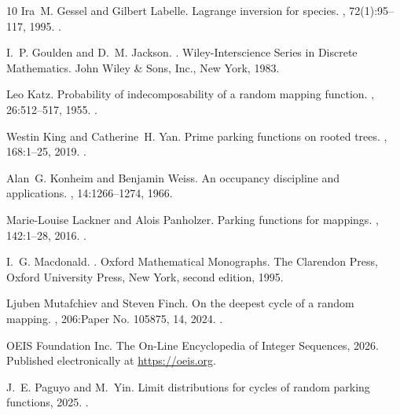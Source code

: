 \documentclass[letterpaper]{amsart}
\theoremstyle{plain}
\theoremstyle{definition}
\theoremstyle{remark}
\begin{document}
\begin{thebibliography}{10}
Ira~M. Gessel and Gilbert Labelle.
\newblock Lagrange inversion for species.
, 72(1):95--117, 1995.
\newblock \href {https://doi.org/10.1016/0097-3165(95)90030-6} {}.

I.~P. Goulden and D.~M. Jackson.
.
\newblock Wiley-Interscience Series in Discrete Mathematics. John Wiley \& Sons, Inc., New York, 1983.

Leo Katz.
\newblock Probability of indecomposability of a random mapping function.
, 26:512--517, 1955.
\newblock \href {https://doi.org/10.1214/aoms/1177728496} {}.

Westin King and Catherine~H. Yan.
\newblock Prime parking functions on rooted trees.
, 168:1--25, 2019.
\newblock \href {https://doi.org/10.1016/j.jcta.2019.05.015} {}.

Alan~G. Konheim and Benjamin Weiss.
\newblock An occupancy discipline and applications.
, 14:1266--1274, 1966.

Marie-Louise Lackner and Alois Panholzer.
\newblock Parking functions for mappings.
, 142:1--28, 2016.
\newblock \href {https://doi.org/10.1016/j.jcta.2016.03.001} {}.

I.~G. Macdonald.
.
\newblock Oxford Mathematical Monographs. The Clarendon Press, Oxford University Press, New York, second edition, 1995.

Ljuben Mutafchiev and Steven Finch.
\newblock On the deepest cycle of a random mapping.
, 206:Paper No. 105875, 14, 2024.
\newblock \href {https://doi.org/10.1016/j.jcta.2024.105875} {}.

{{OEIS} {F}oundation {I}nc.}
\newblock The {O}n-{L}ine {E}ncyclopedia of {I}nteger {S}equences, 2026.
\newblock Published electronically at \url{https://oeis.org}.

J.~E. Paguyo and M.~Yin.
\newblock Limit distributions for cycles of random parking functions, 2025.
\newblock \href {https://arxiv.org/abs/2502.07110} {}.


\end{thebibliography}
\end{document}
